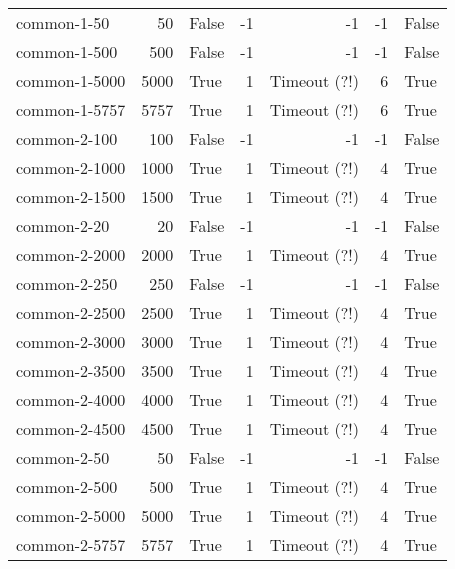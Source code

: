 \begin{longtable}{lrlrrrl}
common-1-50 & 50 & False & -1 & -1 & -1 & False \\

common-1-500 & 500 & False & -1 & -1 & -1 & False \\

common-1-5000 & 5000 & True & 1 & Timeout (?!) & 6 & True \\

common-1-5757 & 5757 & True & 1 & Timeout (?!) & 6 & True \\

common-2-100 & 100 & False & -1 & -1 & -1 & False \\

common-2-1000 & 1000 & True & 1 & Timeout (?!) & 4 & True \\

common-2-1500 & 1500 & True & 1 & Timeout (?!) & 4 & True \\

common-2-20 & 20 & False & -1 & -1 & -1 & False \\

common-2-2000 & 2000 & True & 1 & Timeout (?!) & 4 & True \\

common-2-250 & 250 & False & -1 & -1 & -1 & False \\

common-2-2500 & 2500 & True & 1 & Timeout (?!) & 4 & True \\

common-2-3000 & 3000 & True & 1 & Timeout (?!) & 4 & True \\

common-2-3500 & 3500 & True & 1 & Timeout (?!) & 4 & True \\

common-2-4000 & 4000 & True & 1 & Timeout (?!) & 4 & True \\

common-2-4500 & 4500 & True & 1 & Timeout (?!) & 4 & True \\

common-2-50 & 50 & False & -1 & -1 & -1 & False \\

common-2-500 & 500 & True & 1 & Timeout (?!) & 4 & True \\

common-2-5000 & 5000 & True & 1 & Timeout (?!) & 4 & True \\

common-2-5757 & 5757 & True & 1 & Timeout (?!) & 4 & True \\


\end{longtable}
